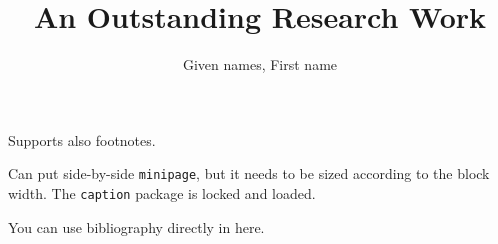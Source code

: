 \documentclass[a2paper]{bigsposter}
\author{Given names, First name}
\title{An Outstanding Research Work}
\institute{Famous Research Institute}
\newcommand{\emptybox}[2]{\framebox[#1]{\rule{0pt}{#2}}}
\begin{document}
  \maketitle
  \begin{blockrow}
    \textcolor{lightgray}{\lipsum[1]}
    Supports also footnotes.
  \blockbreak
    \textcolor{lightgray}{\lipsum[2]}
    \begin{minipage}[t]{0.3\blockwidth}
      Can put side-by-side \texttt{minipage}, but it needs to be sized according to the block width. The \texttt{caption} package is locked and loaded.
    \end{minipage}
    \begin{minipage}[t]{0.7\blockwidth}
      \begin{blockfigure}
        \emptybox{0.9\textwidth}{4em}
      \end{blockfigure}
    \end{minipage}
  \end{blockrow}
  \begin{blockrow}[3]
    \begin{blockfigure}
      \emptybox{0.8\blockwidth}{5em}
    \end{blockfigure}
    \textcolor{lightgray}{\lipsum[3]}
  \blockbreak
    \textcolor{lightgray}{\lipsum[4]}
    \textcolor{lightgray}{\lipsum[5]}
  \blockbreak
    \textcolor{lightgray}{\lipsum[6]}
    You can use bibliography directly in here.
    \nocite{*}
    
    \blockfoot
  \end{blockrow}
\end{document}
